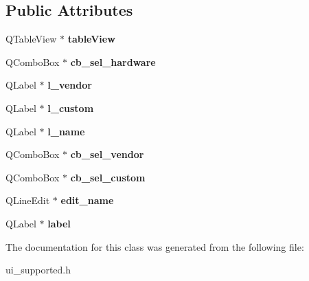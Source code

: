 \subsection*{Public Attributes}
\begin{DoxyCompactItemize}
\item 
\hypertarget{classUi__Supported_ac7aa189fec1d67ba3fbea31b730abb72}{Q\-Table\-View $\ast$ {\bfseries table\-View}}\label{classUi__Supported_ac7aa189fec1d67ba3fbea31b730abb72}

\item 
\hypertarget{classUi__Supported_a270091ee90ddf75c6ef5ad76fcc411c0}{Q\-Combo\-Box $\ast$ {\bfseries cb\-\_\-sel\-\_\-hardware}}\label{classUi__Supported_a270091ee90ddf75c6ef5ad76fcc411c0}

\item 
\hypertarget{classUi__Supported_a2f0ab8f35cdd5ae9ef54517adcb60b26}{Q\-Label $\ast$ {\bfseries l\-\_\-vendor}}\label{classUi__Supported_a2f0ab8f35cdd5ae9ef54517adcb60b26}

\item 
\hypertarget{classUi__Supported_aaad0450a19103f71bc5943f2de044fff}{Q\-Label $\ast$ {\bfseries l\-\_\-custom}}\label{classUi__Supported_aaad0450a19103f71bc5943f2de044fff}

\item 
\hypertarget{classUi__Supported_a841c995091775251005023bc1ebea98e}{Q\-Label $\ast$ {\bfseries l\-\_\-name}}\label{classUi__Supported_a841c995091775251005023bc1ebea98e}

\item 
\hypertarget{classUi__Supported_ac7bfdefacad306bc1cb550c799ccee1f}{Q\-Combo\-Box $\ast$ {\bfseries cb\-\_\-sel\-\_\-vendor}}\label{classUi__Supported_ac7bfdefacad306bc1cb550c799ccee1f}

\item 
\hypertarget{classUi__Supported_ab3fcf2b6fdf3e03ac0283581ef9e039d}{Q\-Combo\-Box $\ast$ {\bfseries cb\-\_\-sel\-\_\-custom}}\label{classUi__Supported_ab3fcf2b6fdf3e03ac0283581ef9e039d}

\item 
\hypertarget{classUi__Supported_ac5bfa65141b0e179f95506575b96f3ed}{Q\-Line\-Edit $\ast$ {\bfseries edit\-\_\-name}}\label{classUi__Supported_ac5bfa65141b0e179f95506575b96f3ed}

\item 
\hypertarget{classUi__Supported_a79c8fffd8ccef6f39108ef7a7a9d0328}{Q\-Label $\ast$ {\bfseries label}}\label{classUi__Supported_a79c8fffd8ccef6f39108ef7a7a9d0328}

\end{DoxyCompactItemize}


The documentation for this class was generated from the following file\-:\begin{DoxyCompactItemize}
\item 
ui\-\_\-supported.\-h\end{DoxyCompactItemize}
